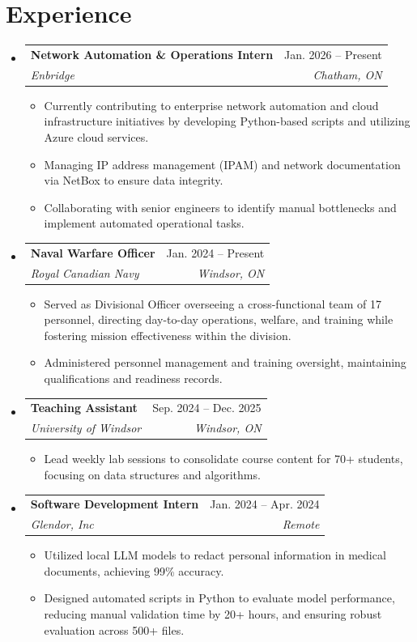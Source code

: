 \documentclass[letterpaper,11pt]{article}
\makeatletter
\newcommand{\resumeItem}[1]{
  \item\small{
    {#1 \vspace{-2pt}}
  }
}
\newcommand{\resumeSubheading}[4]{
  \vspace{-2pt}\item
    \begin{tabular*}{0.97\textwidth}[t]{l@{\extracolsep{\fill}}r}
      \textbf{#1} & #2 \\
      \textit{\small#3} & \textit{\small #4} \\
    \end{tabular*}\vspace{-7pt}
}
\newcommand{\resumeSubHeadingListStart}{\begin{itemize}[leftmargin=0.15in, label={}]}
\newcommand{\resumeSubHeadingListEnd}{\end{itemize}\vspace{-8pt}}
\newcommand{\resumeItemListStart}{\begin{itemize}\vspace{-2pt}}
\newcommand{\resumeItemListEnd}{\end{itemize}\vspace{-8pt}}
\makeatother
\begin{document}
\section{Experience}
  \resumeSubHeadingListStart
    \resumeSubheading
      {Network Automation \& Operations Intern}{Jan. 2026 -- Present}
      {Enbridge}{Chatham, ON}
      \resumeItemListStart
        \resumeItem{Currently contributing to enterprise network automation and cloud infrastructure initiatives by developing Python-based scripts and utilizing Azure cloud services.}
        \resumeItem{Managing IP address management (IPAM) and network documentation via NetBox to ensure data integrity.}
        \resumeItem{Collaborating with senior engineers to identify manual bottlenecks and implement automated operational tasks.}
      \resumeItemListEnd

    \resumeSubheading
      {Naval Warfare Officer}{Jan. 2024 -- Present}
      {Royal Canadian Navy}{Windsor, ON}
      \resumeItemListStart
        \resumeItem{Served as Divisional Officer overseeing a cross-functional team of 17 personnel, directing day-to-day operations, welfare, and training while fostering mission effectiveness within the division.}
        \resumeItem{Administered personnel management and training oversight, maintaining qualifications and readiness records.}
      \resumeItemListEnd

    \resumeSubheading
      {Teaching Assistant}{Sep. 2024 -- Dec. 2025}
      {University of Windsor}{Windsor, ON}
      \resumeItemListStart
        \resumeItem{Lead weekly lab sessions to consolidate course content for 70+ students, focusing on data structures and algorithms.}
      \resumeItemListEnd

    \resumeSubheading
      {Software Development Intern}{Jan. 2024 -- Apr. 2024}
      {Glendor, Inc}{Remote}
      \resumeItemListStart
        \resumeItem{Utilized local LLM models to redact personal information in medical documents, achieving 99\% accuracy.}
        \resumeItem{Designed automated scripts in Python to evaluate model performance, reducing manual validation time by 20+ hours, and ensuring robust evaluation across 500+ files.}
      \resumeItemListEnd
  \resumeSubHeadingListEnd

\end{document}
